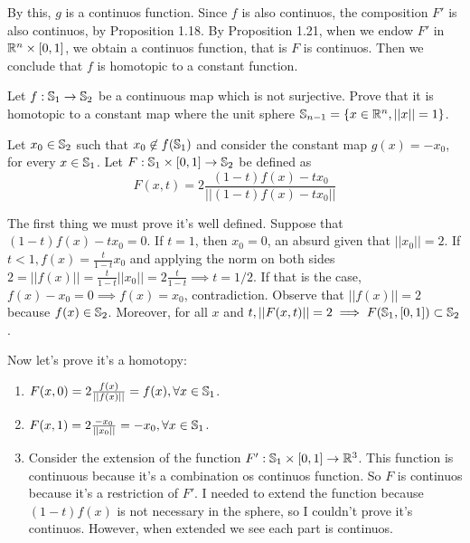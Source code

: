By this, $g$ is a continuos function. Since $f$ is also continuos, the
composition $F'$ is also continuos, by Proposition 1.18. By Proposition 1.21,
when we endow $F'$ in $\mathbb{R}^n \times [0,1]$, we obtain a continuos function,
that is $F$ is continuos. Then we conclude that $f$ is homotopic to a constant
function. 

\noindent\linia

\begin{exercise}
    Let $f : \mathbb{S}_1 \to \mathbb{S}_2$ be a continuous map which is not
    surjective. Prove that it is homotopic to a constant map where the unit sphere $\mathbb{S}_{n-1} = \{x \in \mathbb{R}^n,
    ||x|| = 1\}$. 
\end{exercise}

Let $x_0 \in \mathbb{S}_2$ such that $x_0 \not\in f(\mathbb{S}_1)$ and
consider the constant map $g(x) = -x_0$, for every $x \in \mathbb{S}_1$. Let
$F: \mathbb{S}_1 \times [0,1] \to \mathbb{S}_2$ be defined as 
$$
F(x,t) = 2\frac{(1 - t)f(x) - tx_0}{||(1 - t)f(x) - tx_0||}
$$

The first thing we must prove it's well defined. Suppose that $(1 - t)f(x) -
tx_0 = 0$. If $t = 1$, then $x_0 = 0$, an absurd given that $||x_0|| = 2$. If
$t < 1, f(x) = \frac{t}{1-t}x_0$ and applying the norm on both sides $2 =
||f(x)|| = \frac{t}{1-t}||x_0|| = 2\frac{t}{1-t} \implies t = 1/2$.  If that
is the case, $f(x) - x_0 = 0 \implies f(x) = x_0$, contradiction. Observe
that $||f(x)|| = 2$ because $f(x) \in \mathbb{S}_2$. Moreover, for
all $x$ and $t, ||F(x,t)|| = 2 \implies F(\mathbb{S}_1, [0,1]) \subset
\mathbb{S}_2$. 

Now let's prove it's a homotopy:

\begin{enumerate}
    \item $F(x,0) = 2\frac{f(x)}{||f(x)||} = f(x), \forall x \in
    \mathbb{S}_1$. 

    \item $F(x,1) = 2\frac{-x_0}{||x_0||} = - x_0, \forall x \in
    \mathbb{S}_1$. 

    \item Consider the extension of the function $F' : \mathbb{S}_1 \times
    [0,1] \to \mathbb{R}^3$. This function is continuous because it's a combination os
    continuos function. So $F$ is continuos because it's a restriction of
    $F'$. I needed to extend the function because $(1-t)f(x)$ is not necessary
    in the sphere, so I couldn't prove it's continuos. However, when extended
    we see each part is continuos. 
\end{enumerate}

